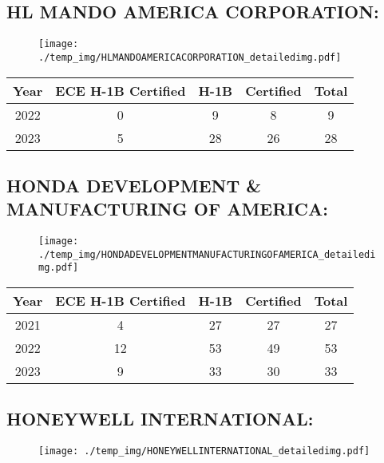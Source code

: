 \documentclass{article}%
\begin{document}
%
\newpage%
\subsection{HL MANDO AMERICA CORPORATION:}%
\label{subsec:HLMANDOAMERICACORPORATION}%
\label{HLMANDOAMERICACORPORATIONdetailed}%


\begin{figure}[htbp]%
\centering%
\texttt{[image: ./temp\_img/HLMANDOAMERICACORPORATION\_detailedimg.pdf]}%
\end{figure}

%
\begin{longtable}{c|c|c|c|c}%
\hline%
Year&ECE H{-}1B Certified&H{-}1B&Certified&Total\\%
\hline%
2022&0&9&8&9\\%
\hline%
2023&5&28&26&28\\%
\hline%
\end{longtable}

%
\newpage%
\subsection{HONDA DEVELOPMENT \& MANUFACTURING OF AMERICA:}%
\label{subsec:HONDADEVELOPMENTMANUFACTURINGOFAMERICA}%
\label{HONDADEVELOPMENTMANUFACTURINGOFAMERICAdetailed}%


\begin{figure}[htbp]%
\centering%
\texttt{[image: ./temp\_img/HONDADEVELOPMENTMANUFACTURINGOFAMERICA\_detailedimg.pdf]}%
\end{figure}

%
\begin{longtable}{c|c|c|c|c}%
\hline%
Year&ECE H{-}1B Certified&H{-}1B&Certified&Total\\%
\hline%
2021&4&27&27&27\\%
\hline%
2022&12&53&49&53\\%
\hline%
2023&9&33&30&33\\%
\hline%
\end{longtable}

%
\newpage%
\subsection{HONEYWELL INTERNATIONAL:}%
\label{subsec:HONEYWELLINTERNATIONAL}%
\label{HONEYWELLINTERNATIONALdetailed}%


\begin{figure}[htbp]%
\centering%
\texttt{[image: ./temp\_img/HONEYWELLINTERNATIONAL\_detailedimg.pdf]}%
\end{figure}
\end{document}
